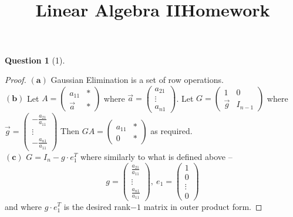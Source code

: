 \documentclass[11pt]{article}
\title{\vspace{-50pt}
\Huge \name
\\\vspace{20pt}
\huge Linear Algebra II\hfill Homework \hw}
\author{}
\date{}
\theoremstyle{quest}
\newtheorem*{question}{Question}
\begin{document}
\maketitle

\begin{question}[1]
\end{question}
\begin{proof}
$\mathbf{(a)}$ Gaussian Elimination is a set of row operations.
\\$\mathbf{(b)}$ Let $A = \begin{pmatrix}
a_{11} & * \\
\vec{a} & * \end{pmatrix}$ where $\vec{a} = \begin{pmatrix}
a_{21} \\
\vdots \\
a_{n1}
\end{pmatrix}$. Let $G = \begin{pmatrix}
1 & 0 \\
\vec{g} & I_{n-1}
\end{pmatrix}$ where $\vec{g} = \begin{pmatrix}
-\frac{a_{21}}{a_{11}} \\
\vdots \\
-\frac{a_{n1}}{a_{11}}
\end{pmatrix}$
Then $GA = \begin{pmatrix}
a_{11} & * \\
0 & *
\end{pmatrix} $ as required.
\\$\mathbf{(c)}$ $G = I_n - g \cdot e_1^T$ where similarly to what is defined above --
$$g = \begin{pmatrix}
\frac{a_{21}}{a_{11}} \\
\vdots \\
\frac{a_{n1}}{a_{11}}
\end{pmatrix},\ e_1 = \begin{pmatrix}
1 \\
0 \\
\vdots \\
0
\end{pmatrix}$$
and where $g \cdot e_1^T$ is the desired rank$-1$ matrix in outer product form.
\end{proof}
\end{document}
